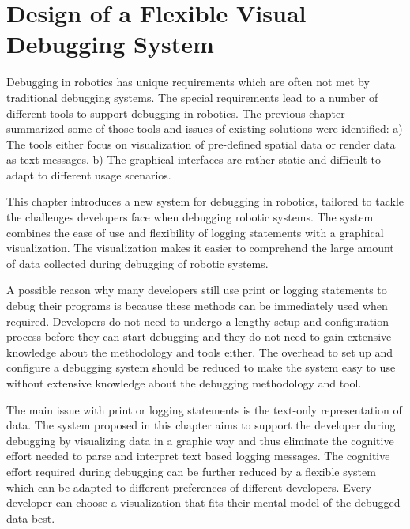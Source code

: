 \chapter[Design of a Flexible Visual Debugging System]{Design of a Flexible Visual\\Debugging System}
\label{visual_debugging_system}

Debugging in robotics has unique requirements which are often not met by traditional debugging systems. The special requirements lead to a number of different tools to support debugging in robotics. The previous chapter summarized some of those tools and issues of existing solutions were identified: a) The tools either focus on visualization of pre-defined spatial data or render data as text messages. b) The graphical interfaces are rather static and difficult to adapt to different usage scenarios.

This chapter introduces a new system for debugging in robotics, tailored to tackle the challenges developers face when debugging robotic systems. The system combines the ease of use and flexibility of logging statements with a graphical visualization. The visualization makes it easier to comprehend the large amount of data collected during debugging of robotic systems.

A possible reason why many developers still use print or logging statements to debug their programs is because these methods can be immediately used when required. Developers do not need to undergo a lengthy setup and configuration process before they can start debugging and they do not need to gain extensive knowledge about the methodology and tools either. The overhead to set up and configure a debugging system should be reduced to make the system easy to use without extensive knowledge about the debugging methodology and tool.

The main issue with print or logging statements is the text-only representation of data. The system proposed in this chapter aims to support the developer during debugging by visualizing data in a graphic way and thus eliminate the cognitive effort needed to parse and interpret text based logging messages. The cognitive effort required during debugging can be further reduced by a flexible system which can be adapted to different preferences of different developers. Every developer can choose a visualization that fits their mental model of the debugged data best.

